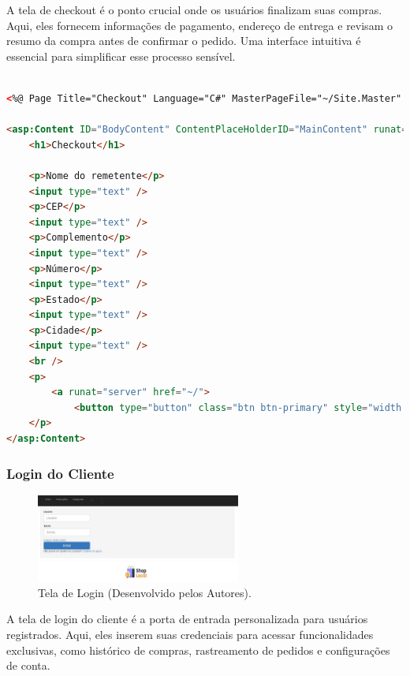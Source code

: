 \documentclass[
	12pt,				%
	openright,			%
	twoside,			%
	a4paper,			%
	english,			%
	brazil				%
	]{abntex2}
\begin{document}
A tela de checkout é o ponto crucial onde os usuários finalizam suas compras. Aqui, eles fornecem informações de pagamento, endereço de entrega e revisam o resumo da compra antes de confirmar o pedido. Uma interface intuitiva é essencial para simplificar esse processo sensível.

\begin{lstlisting}[language=HTML, caption=Tela de Checkout em ASPX, label=lst:aspx]

<%@ Page Title="Checkout" Language="C#" MasterPageFile="~/Site.Master" AutoEventWireup="true" CodeBehind="Checkout.aspx.cs" Inherits="UNIPPIMVIII.Checkout" %>

<asp:Content ID="BodyContent" ContentPlaceHolderID="MainContent" runat="server">
    <h1>Checkout</h1>

    <p>Nome do remetente</p>
    <input type="text" />
    <p>CEP</p>
    <input type="text" />
    <p>Complemento</p>
    <input type="text" />
    <p>Número</p>
    <input type="text" />
    <p>Estado</p>
    <input type="text" />
    <p>Cidade</p>
    <input type="text" />
    <br />
    <p>
        <a runat="server" href="~/">
            <button type="button" class="btn btn-primary" style="width: 30%; height: auto;">Confirmar</button></a>
    </p>
</asp:Content>


\end{lstlisting}


\subsubsection{Login do Cliente}

\begin{figure}[htb]
    \centering
    \includegraphics[width=0.6\textwidth]{img/login-desktop-print.jpg}
    \caption{Tela de Login (Desenvolvido pelos Autores).}
    \label{fig:tela-de-login-desktop}
\end{figure}

A tela de login do cliente é a porta de entrada personalizada para usuários registrados. Aqui, eles inserem suas credenciais para acessar funcionalidades exclusivas, como histórico de compras, rastreamento de pedidos e configurações de conta.
\end{document}
